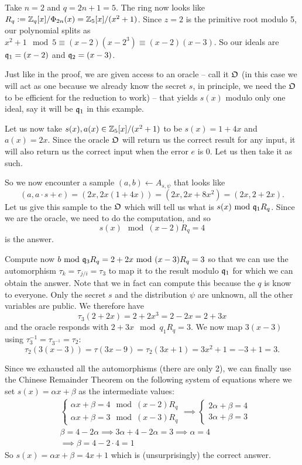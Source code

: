 \begin{example}
	Take $n = 2$ and $q = 2n+1 = 5$. The ring now looks like $R_q := \mathbb{Z}_q[x]/\Phi_{2n}(x) = \mathbb{Z}_5[x]/(x^2+1)$. Since $z = 2$ is the primitive root modulo 5, our polynomial splits as $x^2+1 \mod 5 \equiv (x-2)(x-2^3) \equiv (x-2)(x-3)$. So our ideals are $\mathfrak{q}_1 = (x-2)$ and $\mathfrak{q}_2 = (x-3)$.

	Just like in the proof, we are given access to an oracle -- call it $\mathfrak{O}$ (in this case we will act as one because we already know the secret $s$, in principle, we need the $\mathfrak{O}$ to be efficient for the reduction to work) -- that yields $s(x)$ modulo only one ideal, say it will be $\mathfrak{q}_1$ in this example.

	Let us now take $s(x), a(x) \in \mathbb{Z}_5[x]/(x^2+1)$ to be $s(x) = 1 + 4x$ and $a(x) = 2x$. Since the oracle $\mathfrak{O}$ will return us the correct result for any input, it will also return us the correct input when the error $e$ is 0. Let us then take it as such.

	So we now encounter a sample $(a,b) \leftarrow A_{s, \psi}$ that looks like 
	\[ (a, a\cdot s + e) = (2x, 2x(1+4x)) = (2x, 2x +8x^2) = (2x, 2+2x). \]
	Let us give this sample to the $\mathfrak{O}$ which will tell us what is $s(x) \text{ mod } \mathfrak{q}_1 R_q$. Since we are the oracle, we need to do the computation, and so
	\[ s(x) \mod (x-2)R_q = 4 \]
	is the answer.

	Compute now $b \text{ mod } \mathfrak{q}_3 R_q = 2 +2x \text{ mod } (x-3)R_q = 3$ so that we can use the automorphism $\tau_k = \tau_{j/i} = \tau_3$ to map it to the result modulo $\mathfrak{q}_1$ for which we can obtain the answer. Note that we in fact can compute this because the $q$ is know to everyone. Only the secret $s$ and the distribution $\psi$ are unknown, all the other variables are public. We therefore have
	\[ \tau_3(2+2x) = 2 +2x^3 = 2 -2x = 2+3x \]
	and the oracle responds with $2+3x \mod q_1 R_q = 3$. We now map $3(x-3)$ using $\tau_3^{-1} = \tau_{3^{-1}} = \tau_2$:
	\[ \tau_2(3(x-3)) = \tau(3x-9) = \tau_2(3x+1) = 3x^2 + 1 = -3 +1 = 3. \]

	Since we exhausted all the automorphisms (there are only 2), we can finally use the Chinese Remainder Theorem on the following system of equations where we set $s(x) = \alpha x + \beta$ as the intermediate values:
	\begin{align*} & \begin{cases}
		\alpha x + \beta = 4 \mod (x-2)R_q \\
		\alpha x + \beta = 3 \mod (x-3)R_q
	\end{cases} \implies 
	\begin{cases} 
		2 \alpha + \beta = 4 \\
		3 \alpha + \beta = 3
	\end{cases} \\
				   & \beta = 4 - 2 \alpha \implies 3 \alpha + 4 - 2 \alpha = 3 \implies \alpha = 4 \\
				   & \implies \beta = 4-2\cdot 4 = 1
\end{align*}
So $s(x) = \alpha x + \beta = 4x + 1$ which is (unsurprisingly) the correct answer.	
\end{example}
